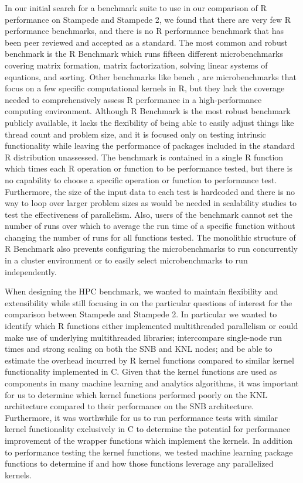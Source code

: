 In our initial search for a benchmark suite to use in our comparison of R performance on
Stampede and Stampede 2, we found that there are very few R performance benchmarks, and
there is no R performance benchmark that has been peer reviewed and accepted as a
standard. The most common and robust benchmark is the R Benchmark
\cite{urbanek:Rbenchmarks} which runs fifteen different microbenchmarks covering matrix
formation, matrix factorization, solving linear systems of equations, and sorting. Other
benchmarks like bench \cite{urbanek:Rbenchmarks}, are microbenchmarks that
focus on a few specific computational kernels in R, but they lack the coverage needed to
comprehensively assess R performance in a high-performance computing environment. Although
R Benchmark is the most robust benchmark publicly available, it lacks the flexibility of
being able to easily adjust things like thread count and problem size, and it is focused
only on testing intrinsic functionality while leaving the performance of packages included
in the standard R distribution unassessed.  The benchmark is contained in a single R
function which times each R operation or function to be performance tested, but there is
no capability to choose a specific operation or function to performance test.
Furthermore, the size of the input data to each test is hardcoded and there is no way to
loop over larger problem sizes as would be needed in scalability studies to test the
effectiveness of parallelism. Also, users of the benchmark cannot set the number of runs
over which to average the run time of a specific function without changing the number of
runs for all functions tested. The monolithic structure of R Benchmark also prevents
configuring the microbenchmarks to run concurrently in a cluster environment or to easily
select microbenchmarks to run independently.

When designing the HPC benchmark, we wanted to maintain flexibility and extensibility while
still focusing in on the particular questions of interest for the comparison between
Stampede and Stampede 2. In particular we wanted to identify which R functions either
implemented multithreaded parallelism or could make use of underlying multithreaded
libraries; intercompare single-node run times and strong scaling on both the SNB
and KNL nodes; and be able to estimate the overhead incurred by R kernel
functions compared to similar kernel functionality implemented in C. Given that the kernel
functions are used as components in many machine learning and analytics algorithms, it was
important for us to determine which kernel functions performed poorly on the KNL
architecture compared to their performance on the SNB architecture. Furthermore, it was
worthwhile for us to run performance tests with similar kernel functionality exclusively
in C to determine the potential for performance improvement of the wrapper functions which
implement the kernels. In addition to performance testing the kernel functions, we tested
machine learning package functions to determine if and how those functions leverage any
parallelized kernels.

